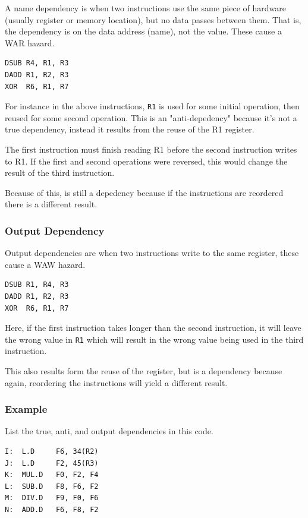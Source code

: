 \documentclass{article}
\begin{document}
A name dependency is when two instructions use the same piece of hardware (usually register or memory location), but no data passes between them. That is, the dependency is on the data address (name), not the value. These cause a WAR hazard.

\begin{Verbatim}
DSUB R4, R1, R3
DADD R1, R2, R3
XOR  R6, R1, R7
\end{Verbatim}

For instance in the above instructions, \texttt{R1} is used for some initial operation, then reused for some second operation. This is an "anti-depedency" because it's not a true dependency, instead it results from the reuse of the R1 register. 

The first instruction must finish reading R1 before the second instruction writes to R1. If the first and second operations were reversed, this would change the result of the third instruction.

Because of this, is still a depedency because if the instructions are reordered there is a different result. 

\subsubsection{Output Dependency}

Output dependencies are when two instructions write to the same register, these cause a WAW hazard.

\begin{Verbatim}
DSUB R1, R4, R3
DADD R1, R2, R3
XOR  R6, R1, R7
\end{Verbatim}

Here, if the first instruction takes longer than the second instruction, it will leave the wrong value in \texttt{R1} which will result in the wrong value being used in the third instruction.

This also results form the reuse of the register, but is a dependency because again, reordering the instructions will yield a different result.

\subsubsection*{Example}

List the true, anti, and output dependencies in this code.

\begin{Verbatim}
I:  L.D     F6, 34(R2)
J:  L.D     F2, 45(R3)
K:  MUL.D   F0, F2, F4
L:  SUB.D   F8, F6, F2
M:  DIV.D   F9, F0, F6
N:  ADD.D   F6, F8, F2
\end{Verbatim}
\end{document}
